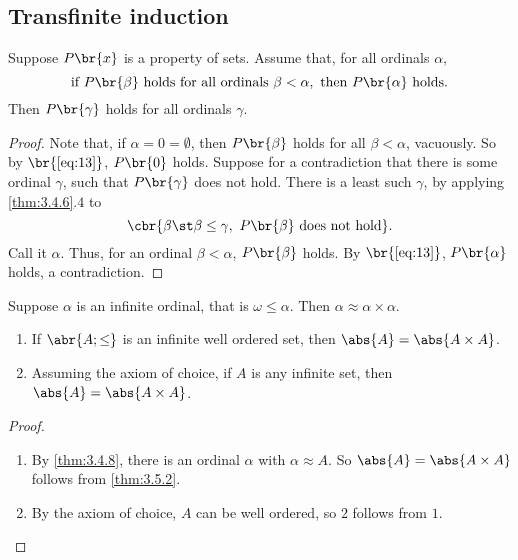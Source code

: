 \subsection{Transfinite induction}

\begin{theorem}
\label{thm:3.5.1}
Suppose $ P\br{x} $ is a property of sets. Assume that, for all ordinals $ \alpha $,
\begin{equation}
\label{eq:13}
\text{if} \ P\br{\beta} \ \text{holds for all ordinals} \ \beta < \alpha, \ \text{then} \ P\br{\alpha} \ \text{holds}.
\end{equation}
Then $ P\br{\gamma} $ holds for all ordinals $ \gamma $.
\end{theorem}

\begin{proof}
Note that, if $ \alpha = 0 = \emptyset $, then $ P\br{\beta} $ holds for all $ \beta < \alpha $, vacuously. So by $ \br{\ref{eq:13}} $, $ P\br{0} $ holds. Suppose for a contradiction that there is some ordinal $ \gamma $, such that $ P\br{\gamma} $ does not hold. There is a least such $ \gamma $, by applying \ref{thm:3.4.6}.$ 4 $ to
$$ \cbr{\beta \st \beta \le \gamma, \ P\br{\beta} \ \text{does not hold}}. $$
Call it $ \alpha $. Thus, for an ordinal $ \beta < \alpha $, $ P\br{\beta} $ holds. By $ \br{\ref{eq:13}} $, $ P\br{\alpha} $ holds, a contradiction.
\end{proof}

\begin{theorem}
\label{thm:3.5.2}
Suppose $ \alpha $ is an infinite ordinal, that is $ \omega \le \alpha $. Then $ \alpha \approx \alpha \times \alpha $.
\end{theorem}

\begin{corollary}
\label{cor:3.5.3}
\hfill
\begin{enumerate}
\item If $ \abr{A; \le} $ is an infinite well ordered set, then $ \abs{A} = \abs{A \times A} $.
\item Assuming the axiom of choice, if $ A $ is any infinite set, then $ \abs{A} = \abs{A \times A} $.
\end{enumerate}
\end{corollary}

\begin{proof}
\hfill
\begin{enumerate}
\item By \ref{thm:3.4.8}, there is an ordinal $ \alpha $ with $ \alpha \approx A $. So $ \abs{A} = \abs{A \times A} $ follows from \ref{thm:3.5.2}.
\item By the axiom of choice, $ A $ can be well ordered, so $ 2 $ follows from $ 1 $.
\end{enumerate}
\end{proof}

